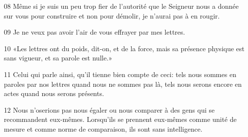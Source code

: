 
08 Même si je suis un peu trop fier de l’autorité que le Seigneur nous a donnée sur vous pour construire et non pour démolir, je n’aurai pas à en rougir.

09 Je ne veux pas avoir l’air de vous effrayer par mes lettres.

10 «Les lettres ont du poids, dit-on, et de la force, mais sa présence physique est sans vigueur, et sa parole est nulle.»

11 Celui qui parle ainsi, qu’il tienne bien compte de ceci: tels nous sommes en paroles par nos lettres quand nous ne sommes pas là, tels nous serons encore en actes quand nous serons présents.

12 Nous n’oserions pas nous égaler ou nous comparer à des gens qui se recommandent eux-mêmes. Lorsqu’ils se prennent eux-mêmes comme unité de mesure et comme norme de comparaison, ils sont sans intelligence.
